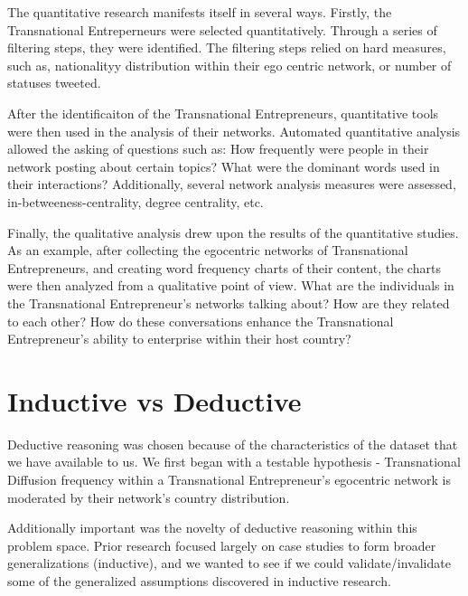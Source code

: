 The quantitative research manifests itself in several ways. Firstly,
the Transnational Entreperneurs were selected quantitatively. Through
a series of filtering steps, they were identified. The filtering steps
relied on hard measures, such as, nationalityy distribution within
their ego centric network, or number of statuses tweeted.

After the identificaiton of the Transnational Entrepreneurs,
quantitative tools were then used in the analysis of their
networks. Automated quantitative analysis allowed the asking of
questions such as: How frequently were people in their network posting
about certain topics?  What were the dominant words used in their
interactions? Additionally, several network analysis measures were
assessed, in-betweeness-centrality, degree centrality, etc.

Finally, the qualitative analysis drew upon the results of the
quantitative studies. As an example, after collecting the egocentric
networks of Transnational Entrepreneurs, and creating word frequency
charts of their content, the charts were then analyzed from a
qualitative point of view. What are the individuals in the
Transnational Entrepreneur's networks talking about? How are they
related to each other? How do these conversations enhance the
Transnational Entrepreneur's ability to enterprise within their host
country?

\section{Inductive vs Deductive}
Deductive reasoning was chosen because of the characteristics of the
dataset that we have available to us. We first began with a testable
hypothesis - Transnational Diffusion frequency within a Transnational
Entrepreneur's egocentric network is moderated by their network's
country distribution.

Additionally important was the novelty of deductive reasoning within
this problem space. Prior research focused largely on case studies to
form broader generalizations (inductive), and we wanted to see if we
could validate/invalidate some of the generalized assumptions
discovered in inductive research.
